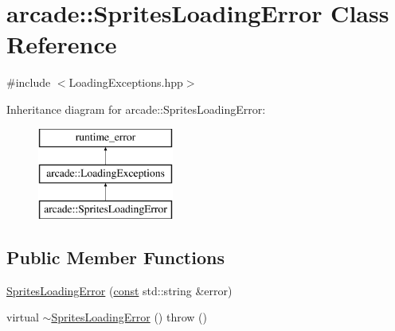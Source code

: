 \hypertarget{classarcade_1_1_sprites_loading_error}{\section{arcade\-:\-:Sprites\-Loading\-Error Class Reference}
\label{classarcade_1_1_sprites_loading_error}
}


{\ttfamily \#include $<$Loading\-Exceptions.\-hpp$>$}

Inheritance diagram for arcade\-:\-:Sprites\-Loading\-Error\-:\begin{figure}[H]
\begin{center}
\leavevmode
\includegraphics[height=3.000000cm]{classarcade_1_1_sprites_loading_error}
\end{center}
\end{figure}
\subsection*{Public Member Functions}
\begin{DoxyCompactItemize}
\item 
\hyperlink{classarcade_1_1_sprites_loading_error_a753a6be84943e2d40bddfbe770df8772}{Sprites\-Loading\-Error} (\hyperlink{term__entry_8h_a57bd63ce7f9a353488880e3de6692d5a}{const} std\-::string \&error)
\item 
virtual \hyperlink{classarcade_1_1_sprites_loading_error_affa19e1b4e7b69b082180dfbeda5dab8}{$\sim$\-Sprites\-Loading\-Error} ()  throw ()
\end{DoxyCompactItemize}


